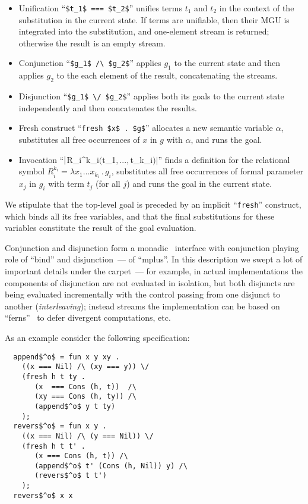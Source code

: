 \begin{itemize}
\item Unification ``\lstinline|$t_1$ === $t_2$|'' unifies terms $t_1$ and $t_2$ in the context of the substitution in the current state. If terms are unifiable,
  then their MGU is integrated into the substitution, and one-element stream is returned; otherwise the result is an empty stream.
\item Conjunction ``\lstinline|$g_1$ /\ $g_2$|'' applies $g_1$ to the current state and then applies $g_2$ to the each element of the result, concatenating
  the streams.
\item Disjunction ``\lstinline|$g_1$ \/ $g_2$|'' applies both its goals to the current state independently and then concatenates the results.
\item Fresh construct ``\lstinline|fresh $x$ . $g$|'' allocates a new semantic variable $\alpha$, substitutes all free occurrences of $x$ in $g$ with $\alpha$, and
  runs the goal.
\item Invocation ``$\lstinline|$R_i^{k_i}$ ($t_1$,...,$t_{k_i}$)|$'' finds a definition for the relational symbol $R_i^{k_i}=\lambda x_1\dots x_{k_i}\,.\,g_i$, substitutes
  all free occurrences of formal parameter $x_j$ in $g_i$ with term $t_j$ (for all $j$) and runs the goal in the current state.
\end{itemize}

We stipulate that the top-level goal is preceded by an implicit ``\lstinline|fresh|'' construct, which binds all its free variables, and that the final substitutions
for these variables constitute the result of the goal evaluation.

Conjunction and disjunction form a monadic~\cite{Monads} interface with conjunction playing role of ``bind'' and disjunction~--- of ``mplus''. In this description
we swept a lot of important details under the carpet~--- for example, in actual implementations the components of disjunction are not evaluated in isolation, but
both disjuncts are being evaluated incrementally with the control passing from one disjunct to another (\emph{interleaving}); instead streams the implementation
can be based on ``ferns''~\cite{BottomAvoiding} to defer divergent computations, etc. 

As an example consider the following specification:

\begin{lstlisting}
  append$^o$ = fun x y xy .
    ((x === Nil) /\ (xy === y)) \/
    (fresh h t ty .
       (x  === Cons (h, t))  /\
       (xy === Cons (h, ty)) /\
       (append$^o$ y t ty)
    );
  revers$^o$ = fun x y .
    ((x === Nil) /\ (y === Nil)) \/
    (fresh h t t' .
       (x === Cons (h, t)) /\
       (append$^o$ t' (Cons (h, Nil)) y) /\
       (revers$^o$ t t') 
    );
  revers$^o$ x x
\end{lstlisting}

